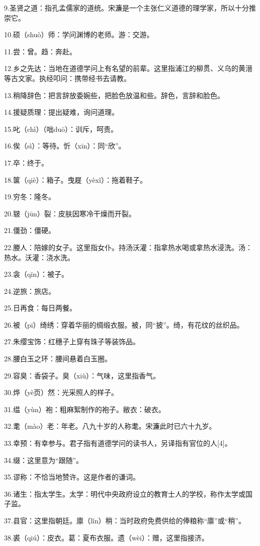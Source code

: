 \documentclass[letterpaper,10pt,english]{sphinxmanual}
\begin{document}
9.圣贤之道：指孔孟儒家的道统。宋濂是一个主张仁义道德的理学家，所以十分推崇它。

10.硕（shuò）师：学问渊博的老师。游：交游。

11.尝：曾。趋：奔赴。

12.乡之先达：当地在道德学问上有名望的前辈。这里指浦江的柳贯、义乌的黄溍等古文家。执经叩问：携带经书去请教。

13.稍降辞色：把言辞放委婉些，把脸色放温和些。辞色，言辞和脸色。

14.援疑质理：提出疑难，询问道理。

15.叱（chì）（咄duō）：训斥，呵责。

16.俟（sì）：等待。忻（xīn）：同“欣”。

17.卒：终于。

18.箧（qiè）：箱子。曳屣（yèxǐ）：拖着鞋子。

19.穷冬：隆冬。

20.皲（jūn）裂：皮肤因寒冷干燥而开裂。

21.僵劲：僵硬。

22.媵人：陪嫁的女子。这里指女仆。持汤沃灌：指拿热水喝或拿热水浸洗。汤：热水。沃灌：浇水洗。

23.衾（qīn）：被子。

24.逆旅：旅店。

25.日再食：每日两餐。

26.被（pī）绮绣：穿着华丽的绸缎衣服。被，同“披”。绮，有花纹的丝织品。

27.朱缨宝饰：红穗子上穿有珠子等装饰品。

28.腰白玉之环：腰间悬着白玉圈。

29.容臭：香袋子。臭（xiù）：气味，这里指香气。

30.烨（yè页）然：光采照人的样子。

31.缊（yùn）袍：粗麻絮制作的袍子。敝衣：破衣。

32.耄（mào）老：年老。八九十岁的人称耄。宋濂此时已六十九岁。

33.幸预：有幸参与。君子指有道德学问的读书人，另译指有官位的人{[}4{]}。

34.缀：这里意为“跟随”。

35.谬称：不恰当地赞许。这是作者的谦词。

36.诸生：指太学生。太学：明代中央政府设立的教育士人的学校，称作太学或国子监。

37.县官：这里指朝廷。廪（lǐn）稍：当时政府免费供给的俸粮称“廪”或“稍”。

38.裘（qiú）：皮衣。葛：夏布衣服。遗（wèi）：赠，这里指接济。
\end{document}
